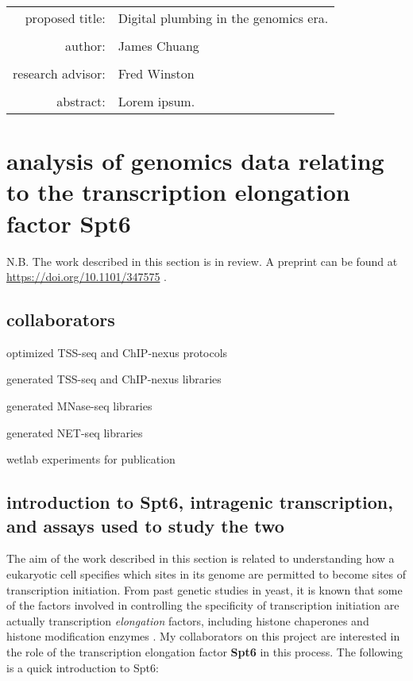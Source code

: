 \documentclass[11pt, letterpaper]{article}
\begin{document}
\begin{titlepage}
\begin{tabular}{ r l }
 proposed title:   & Digital plumbing in the genomics era. \\
 		   & \\
 author:	   & James Chuang \\
 		   & \\
 research advisor: & Fred Winston \\
 		   & \\
 abstract:	   & Lorem ipsum.
\end{tabular}
\end{titlepage}

\tableofcontents
\newpage

\section{analysis of genomics data relating to the transcription elongation factor Spt6}

N.B. The work described in this section is in review. A preprint can be found at \url{https://doi.org/10.1101/347575} \cite{doris2018}.

\subsection{collaborators}

\begin{description}[align=right, labelwidth=5cm, noitemsep]
    \item [Steve Doris] optimized TSS-seq and ChIP-nexus protocols
    \item [] generated TSS-seq and ChIP-nexus libraries
    \item [Olga Viktorovskaya] generated MNase-seq libraries
    \item [Magdalenda Murawska] generated NET-seq libraries
    \item [Dan Spatt] wetlab experiments for publication
\end{description}

\subsection{introduction to Spt6, intragenic transcription, and assays used to study the two}

The aim of the work described in this section is related to understanding how a eukaryotic cell specifies which sites in its genome are permitted to become sites of transcription initiation. From past genetic studies in yeast, it is known that some of the factors involved in controlling the specificity of transcription initiation are actually transcription \textit{elongation} factors, including histone chaperones and histone modification enzymes \cite{kaplan2003, cheung2008, hennig2013}. My collaborators on this project are interested in the role of the transcription elongation factor \textbf{Spt6} in this process. The following is a quick introduction to Spt6:
\end{document}
